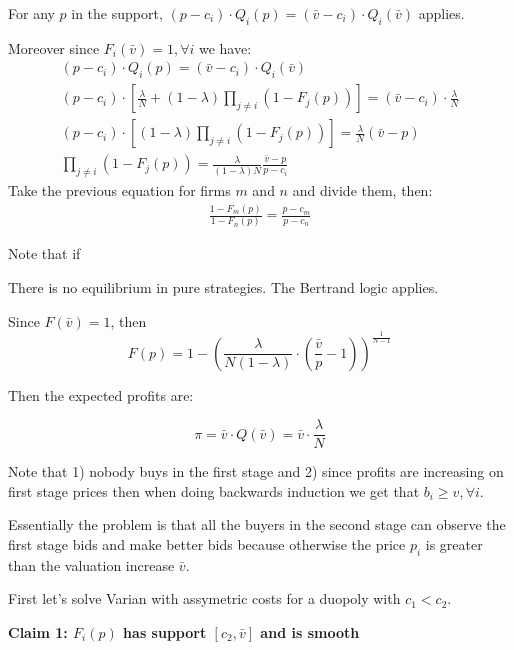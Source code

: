 \documentclass[12pt]{article}
\theoremstyle{plain}
\theoremstyle{plain}
\begin{document}
For any $p$ in the support, $(p - c_i) \cdot Q_i(p) = (\bar{v}-c_i) \cdot Q_i(\bar{v})$ applies. 


Moreover since $F_i(\bar{v}) = 1, \forall i$ we have: 
\begin{align*}
    (p - c_i) \cdot Q_i(p) = (\bar{v}-c_i) \cdot Q_i(\bar{v}) \\
     (p - c_i) \cdot \left[\frac{\lambda}{N} +  (1 - \lambda) \prod_{j\neq i} \left(1 - F_j(p)\right)\right] = (\bar{v}-c_i) \cdot \frac{\lambda}{N} \\
     (p- c_i) \cdot \left[ (1 - \lambda) \prod_{j\neq i} \left(1 - F_j(p)\right)\right] = \frac{\lambda}{N}(\bar{v}-p) \\
      \prod_{j\neq i} \left(1 - F_j(p)\right) = \frac{\lambda}{(1 - \lambda)N}\frac{\bar{v}-p}{p- c_i} 
\end{align*}
Take the previous equation for firms $m$ and $n$ and divide them, then: 
\begin{align*}
    \frac{1 - F_m(p)}{1 - F_n(p)}  = \frac{p-c_m}{p- c_n}
\end{align*}

Note that if 


\vspace{3cm}


There is no equilibrium in pure strategies. The Bertrand logic applies.




Since $F(\bar{v}) = 1$, then
\[
F(p) = 1 - \left( \frac{ \lambda}{N (1- \lambda)} \cdot \left( \frac{\bar{v}}{p} - 1 \right) \right)^{\frac{1}{N-1}}
\]

Then the expected profits are: 

\[
\pi =  \bar{v} \cdot Q(\bar{v})=  \bar{v} \cdot \frac{\lambda}{N}
\]

Note that 1) nobody buys in the first stage and 2) since profits are increasing on first stage prices then when doing backwards induction we get that $b_i \geq v, \forall i$. 

Essentially the problem is that all the buyers in the second stage can observe the first stage bids and make better bids because otherwise the price $p_i$ is greater than the valuation increase $\bar{v}$. 


\vspace{3cm}

First let's solve Varian with assymetric costs for a duopoly with $c_1 < c_2$.

\textbf{Claim 1: $F_i(p)$ has support $[c_2, \bar{v}]$ and is smooth}
\end{document}
